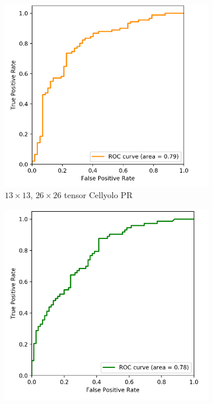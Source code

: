 \begin{figure}[h]
	\begin{center}
		\begin{subfigure}[b]{0.49\textwidth}
			\includegraphics[width=\textwidth]{thesis-template-master/images/2 tensor cellyolo ROC.png}
			\caption{$13 \times 13$, $26 \times 26$ tensor Cellyolo PR }
			\label{fig:res18}
		\end{subfigure}
		\begin{subfigure}[b]{0.49\textwidth}
		    \centering
			\includegraphics[width=\textwidth]{thesis-template-master/images/52 tensor cellyolo ROC.png}

\end{subfigure}
\end{center}
\end{figure}
